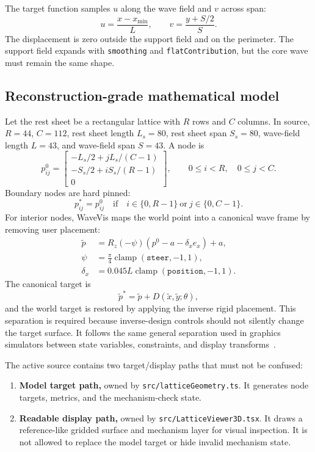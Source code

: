 \documentclass[12pt,letterpaper]{article}
\newcommand{\code}[1]{\texttt{#1}}
\newcommand{\clamp}{\operatorname{clamp}}
\begin{document}
The target function samples \(u\) along the wave field and \(v\) across span:
\[
  u = \frac{x-x_{\min}}{L}, \qquad
  v = \frac{y + S/2}{S}.
\]
The displacement is zero outside the support field and on the perimeter. The support field expands with \code{smoothing} and \code{flatContribution}, but the core wave must remain the same shape.

\subsection{Reconstruction-grade mathematical model}

Let the rest sheet be a rectangular lattice with \(R\) rows and \(C\) columns. In source, \(R=44\), \(C=112\), rest sheet length \(L_s=80\), rest sheet span \(S_s=80\), wave-field length \(L=43\), and wave-field span \(S=43\). A node is
\[
  p^0_{ij} =
  \begin{bmatrix}
    -L_s/2 + jL_s/(C-1)\\
    -S_s/2 + iS_s/(R-1)\\
    0
  \end{bmatrix},
  \qquad
  0\le i<R,\quad 0\le j<C.
\]
Boundary nodes are hard pinned:
\[
  p^*_{ij}=p^0_{ij}\quad\text{if}\quad i\in\{0,R-1\}\ \text{or}\ j\in\{0,C-1\}.
\]
For interior nodes, WaveVis maps the world point into a canonical wave frame by removing user placement:
\[
\begin{aligned}
  \tilde p &= R_z(-\psi)\left(p^0 - a - \delta_x e_x\right)+a,\\
  \psi &= \frac{\pi}{4}\clamp(\code{steer},-1,1),\\
  \delta_x &= 0.045L\clamp(\code{position},-1,1).
\end{aligned}
\]
The canonical target is
\[
  \tilde p^* = \tilde p + D(\tilde x,\tilde y;\theta),
\]
and the world target is restored by applying the inverse rigid placement. This separation is required because inverse-design controls should not silently change the target surface. It follows the same general separation used in graphics simulators between state variables, constraints, and display transforms~\cite{muller_position_based_2007,bouaziz_projective_2014}.

The active source contains two target/display paths that must not be confused:
\begin{enumerate}
  \item \textbf{Model target path,} owned by \code{src/latticeGeometry.ts}. It generates node targets, metrics, and the mechanism-check state.
  \item \textbf{Readable display path,} owned by \code{src/LatticeViewer3D.tsx}. It draws a reference-like gridded surface and mechanism layer for visual inspection. It is not allowed to replace the model target or hide invalid mechanism state.
\end{enumerate}
\end{document}
